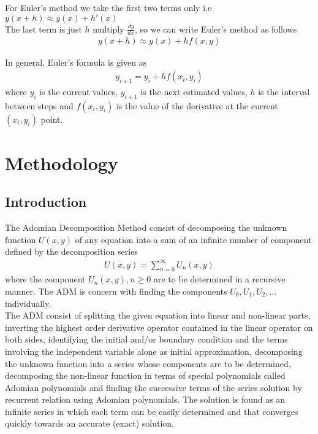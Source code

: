 \documentclass[11pt]{report}
\newcommand{\dsp}{\displaystyle}
\newcommand{\NI}{\noindent}
\newcommand{\sprime}{'}
\begin{document}
	\NI For Euler's method we take the first two terms only i.e $\dsp y(x+h) \approx y(x) + h\sprime(x)$\\
	The last term is just $h$ multiply $\dsp\frac{dy}{dx}$, so we can write Euler's method as follows
	\begin{eqnarray}
		y(x+h) \approx y(x) + hf(x,y)
	\end{eqnarray} 

	\NI In general, Euler's formula is given as 
	\begin{eqnarray}
		y_{i+1} = y_i + hf(x_i,y_i)
	\end{eqnarray}
	where $y_i$ is the current values, $y_{i+1}$ is the next estimated values, $h$ is the interval between steps and $f(x_i,y_i)$ is the value of the derivative at the current $(x_i,y_i)$ point.
	

	
	\chapter{Methodology}
	\section{Introduction}
	The Adomian Decomposition Method consist of decomposing the unknown function $U(x,y)$ of any equation into a sum of an infinite number of component defined by the decomposition series
	\begin{eqnarray}
		U(x,y) = \sum_{n=0}^{\infty} U_n(x,y)
	\end{eqnarray}
	where the component $U_n(x,y), n\geq 0$ are to be determined in a recursive manner. The ADM is concern with finding the components $U_0, U_1, U_2,\ldots$ individually.\\
	
	\NI The ADM consist of splitting the given equation into linear and non-linear parts, inverting the highest order derivative operator contained in the linear operator on both sides, identifying the initial and/or boundary condition and the terms involving the independent variable alone as initial approximation, decomposing the unknown function into a series whose components are to be determined, decomposing the non-linear function in terms of special polynomials called Adomian polynomials and finding the successive terms of the series solution by recurrent relation using Adomian polynomials. The solution is found as an infinite series in which each term can be easily determined and that converges quickly towards an accurate (exact) solution.
	
\end{document}
